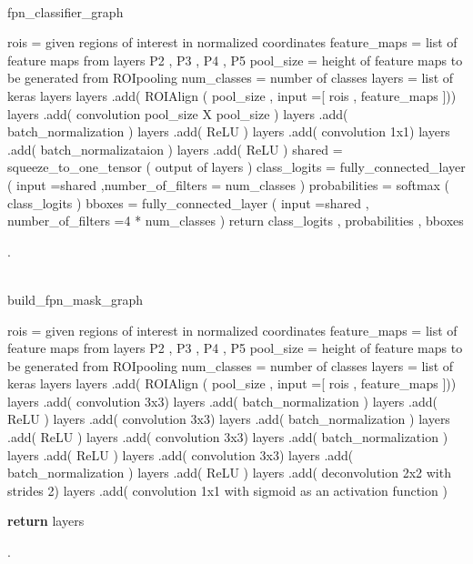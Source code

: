 \\
\begin{algorithm}[H]
  \caption{fpn\_classifier\_graph}
  \SetAlgoLined
  \DontPrintSemicolon
  rois = given regions of interest in normalized coordinates\;
  feature\_maps = list of feature maps from layers P2 , P3 , P4 , P5\;
   pool\_size = height of feature maps to be generated from ROIpooling\;
  num\_classes = number of classes\;
  layers = list of keras layers\;
  layers .add( ROIAlign ( pool\_size , input =[ rois , feature\_maps ]))\;
   layers .add( convolution pool\_size X pool\_size )\;
   layers .add( batch\_normalization )\;
   layers .add( ReLU )\;
   layers .add( convolution 1x1)\;
   layers .add( batch\_normalizataion )\;
   layers .add( ReLU )\;
   shared = squeeze\_to\_one\_tensor ( output of layers )\;
   class\_logits = fully\_connected\_layer ( input =shared ,number\_of\_filters = num\_classes )\;
   probabilities = softmax ( class\_logits )\;
   bboxes = fully\_connected\_layer ( input =shared , number\_of\_filters =4 * num\_classes )\;
   return class\_logits , probabilities , bboxes\;
  
  
\end{algorithm}
.\\
\\
\begin{algorithm}[H]
  \caption{build\_fpn\_mask\_graph}
  \SetAlgoLined
  \DontPrintSemicolon
   rois = given regions of interest in normalized coordinates\;
   feature\_maps = list of feature maps from layers P2 , P3 , P4 , P5\;
   pool\_size = height of feature maps to be generated from ROIpooling\;
   num\_classes = number of classes\;
   layers = list of keras layers\;
   layers .add( ROIAlign ( pool\_size , input =[ rois , feature\_maps ]))\;
   layers .add( convolution 3x3)\;
   layers .add( batch\_normalization )\;
   layers .add( ReLU )\;
   layers .add( convolution 3x3)\;
   layers .add( batch\_normalization )\;
   layers .add( ReLU )\;
   layers .add( convolution 3x3)\;
   layers .add( batch\_normalization )\;
   layers .add( ReLU )\;
   layers .add( convolution 3x3)\;
   layers .add( batch\_normalization )\;
   layers .add( ReLU )\;
   layers .add( deconvolution 2x2 with strides 2)\;
   layers .add( convolution 1x1 with sigmoid as an activation function )\;
  
   \textbf{return} layers
\end{algorithm}
.\\
\\

